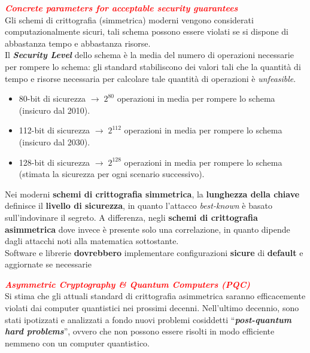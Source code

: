 \begin{flushleft}
    \textcolor{red}{\textbf{\textit{Concrete parameters for acceptable security guarantees}}} \\
    Gli schemi di crittografia (simmetrica) moderni vengono considerati computazionalmente sicuri, tali schema possono essere violati se si dispone di abbastanza tempo e abbastanza risorse. \\
    Il \textbf{\textit{Security Level}} dello schema è la media del numero di operazioni necessarie per rompere lo schema: gli standard stabiliscono dei valori tali che la quantità di tempo e risorse necessaria per calcolare tale quantità di operazioni è \textit{unfeasible}.
    \begin{itemize}[nosep]
        \item 80-bit di sicurezza $\rightarrow \; 2^{80}$ operazioni in media per rompere lo schema (insicuro dal 2010).
        \item 112-bit di sicurezza $\rightarrow \; 2^{112}$ operazioni in media per rompere lo schema (insicuro dal 2030).
        \item 128-bit di sicurezza $\rightarrow \; 2^{128}$ operazioni in media per rompere lo schema (stimata la sicurezza per ogni scenario successivo).
    \end{itemize}

    Nei moderni \textbf{schemi di crittografia simmetrica}, la \textbf{lunghezza della chiave} definisce il \textbf{livello di sicurezza}, in quanto l'attacco \textit{best-known} è basato sull'indovinare il segreto. A differenza, negli \textbf{schemi di crittografia asimmetrica} dove invece è presente solo una correlazione, in quanto dipende dagli attacchi noti alla matematica sottostante. \\

    Software e librerie \textbf{dovrebbero} implementare configurazioni \textbf{sicure} di \textbf{default} e aggiornate se necessarie
\end{flushleft}

\begin{flushleft}
    \textcolor{red}{\textbf{\textit{Asymmetric Cryptography \& Quantum Computers (PQC)}}} \\
    Si stima che gli attuali standard di crittografia asimmetrica saranno efficacemente violati dai computer quantistici nei prossimi decenni. Nell'ultimo decennio, sono stati ipotizzati e analizzati a fondo nuovi problemi cosiddetti ``\textbf{\textit{post-quantum hard problems}}'', ovvero che non possono essere risolti in modo efficiente nemmeno con un computer quantistico.
\end{flushleft}


